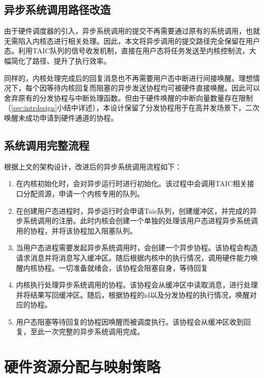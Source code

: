 \subsection{异步系统调用路径改造}

由于硬件调度器的引入，异步系统调用的提交不再需要通过原有的系统调用，也就无需陷入内核态进行相关处理。因此，本文将异步调用的提交路径完全保留在用户态。利用TAIC队列的信号收发机制，直接在用户态将任务发送至内核控制流，大幅简化了路径、提升了执行效率。

同样的，内核处理完成后的回复消息也不再需要用户态中断进行间接唤醒。理想情况下，每个因等待内核回复而阻塞的异步发送协程均可被硬件直接唤醒。因此可以舍弃原有的分发协程与中断处理函数。但由于硬件唤醒的中断向量数量存在限制（\ref{sec:intrdesign}小结中详述），本设计保留了分发协程用于在高并发场景下，二次唤醒未成功申请到硬件通道的协程。

\subsection{系统调用完整流程}

根据上文的架构设计，改进后的异步系统调用流程如下：

\begin{enumerate}
  \item 在内核初始化时，会对异步运行时进行初始化。该过程中会调用TAIC相关接口分配资源，申请一个内核专用的队列。
  \item 在创建用户态进程时，异步运行时会申请Taic队列，创建缓冲区，并完成的异步系统调用的注册。此时内核会创建一个单独的处理该用户态进程异步系统调用的协程，并将该协程加入阻塞队列。
  \item 当用户态进程需要发起异步系统调用时，会创建一个异步协程。该协程会构造请求消息并将消息写入缓冲区。随后根据内核中的执行情况，调用硬件能力唤醒内核协程。一切准备就绪会，该协程会阻塞自身，等待回复
  \item 内核执行处理异步系统调用的协程。该协程会从缓冲区中读取消息，进行处理并将结果写回缓冲区。随后，根据协程的id以及分发协程的执行情况，唤醒对应的协程。
  \item 用户态阻塞等待回复的协程因唤醒而被调度执行。该协程会从缓冲区收到回复，至此一次完整的异步系统调用完成。
\end{enumerate}



\section{硬件资源分配与映射策略}

